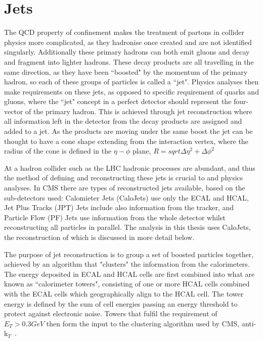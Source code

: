\section{Jets}
 The QCD property of confinement makes the treatment of partons in collider physics more complicated, as they hadronise once created and are not identified singularly. Additionally these primary hadrons can both emit gluons and decay and fragment into lighter hadrons. These decay products are all travelling in the same direction, as they have been ``boosted" by the momentum of the primary hadron, so each of these groups of particles is called a ``jet". Physics analyses then make requirements on these jets, as opposed to specific requirement of quarks and gluons, where the ``jet" concept in a perfect detector should represent the four-vector of the primary hadron. This is achieved through jet reconstruction where all information left in the detector from the decay products are assigned and added to a jet. As the products are moving under the same boost the jet can be thought to have a cone shape extending from the interaction vertex, where the radius of the cone is defined in the $\eta-\phi$ plane, $R= sqrt{\Delta \eta^{2} + \Delta \phi^{2}}$
 
 At a hadron collider such as the LHC hadronic processes are abundant, and thus the method of defining and reconstructing these jets is crucial to and physics analyses. In CMS there are types of reconstructed jets available, based on the sub-detectors used: Calomieter Jets (CaloJets) use only the ECAL and HCAL, Jet Plus Tracks (JPT) Jets include also information from the tracker, and Particle Flow (PF) Jets use information from the whole detector whilst reconstructing all particles in parallel. The analysis in this thesis uses CaloJets, the reconstruction of which is discussed in more detail below. 
 
 The purpose of jet reconstruction is to group a set of boosted particles together, achieved by an algorithm that "clusters" the information from the calorimeters. The energy deposited in ECAL and HCAL cells are first combined into what are known as ``calorimeter towers", consisting of one or more HCAL cells combined with the ECAL cells which geographically align to the HCAL cell. The tower energy is defined by the sum of cell energies passing an energy threshold to protect against electronic noise. Towers that fulfil the requirement of $E_{T} > 0.3 GeV$ then form the input to the clustering algorithm used by CMS, anti-k$_{T}$~\cite{jetroundup}.

